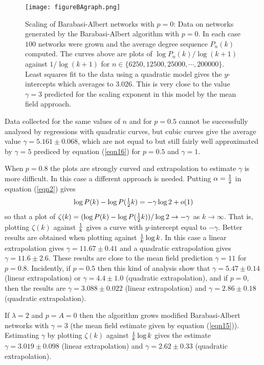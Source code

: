 \documentclass[12pt]{iopart}
\def\sfrac#1#2{\hbox{\normalsize $\frac{#1}{#2}$}}
\def\Ref#1{(\ref{#1})}
\begin{document}
\begin{figure}[t!]
 \centering
\texttt{[image: figureBAgraph.png]}
\caption{{Scaling of Barabasi-Albert networks with $p=0$:}
Data on networks generated by the Barabasi-Albert algorithm with $p=0$.  In each case $100$
networks were grown and the average degree sequence $P_n(k)$ computed.  The curves above
are plots of $\log P_n(k)/\log (k+1)$ against $1/\log (k+1)$ for $n\in\{6250,12500,25000,\cdots,200000\}$.
Least squares fit to the data using a quadratic model gives the $y$-intercepts which 
averages to $3.026$.  This is very close to the value $\gamma=3$ predicted for the scaling
exponent in this model by the mean field approach.}
\label{figureBAgraph}
\end{figure}

Data collected for the same values of $n$ and for $p=0.5$ cannot be successfully analysed
by regressions with quadratic curves, but cubic curves give the average value
$\gamma = 5.161 \pm 0.068$, which are not equal to but still fairly well approximated by $\gamma=5$
prediced by equation \Ref{eqn16} for $p=0.5$ and $\gamma=1$.

When $p=0.8$ the plots are strongly curved and extrapolation to estimate $\gamma$ is more
difficult.  In this case a different approach is needed.  Putting $\alpha = \sfrac{1}{2}$ in
equation \Ref{eqn2} gives
\begin{equation}
\log P(k) - \log P(\sfrac{1}{2}k) = - \gamma \log 2 + o(1)
\end{equation}
so that a plot of $\zeta(k) = (\log P(k) - \log P(\sfrac{1}{2}k))/\log 2 \to - \gamma$ as $k\to\infty$.
That is, plotting $\zeta(k)$ against $\sfrac{1}{k}$ gives a curve with $y$-intercept 
equal to $-\gamma$.  Better results are obtained when plotting against $\sfrac{1}{k}\log k$.
In this case a linear extrapolation gives $\gamma=11.67\pm0.41$ and a quadratic extrapolation
gives $\gamma=11.6\pm2.6$.  These results are close to the mean field prediction $\gamma=11$
for $p=0.8$.  Incidently, if $p=0.5$ then this kind of analysis show that $\gamma=5.47\pm0.14$
(linear extrapolation) or $\gamma=4.4\pm1.0$ (quadratic extrapolation), 
and if $p=0$, then the results are $\gamma=3.088\pm 0.022$ (linear extrapolation)
and $\gamma = 2.86\pm0.18$ (quadratic extrapolation).

If $\lambda=2$ and $p=A=0$ then the algorithm grows modified Barabasi-Albert networks
with $\gamma=3$ (the mean field estimate given by equation \Ref{eqn15}).  Estimating
$\gamma$ by plotting $\zeta(k)$ against $\sfrac{1}{k}\log k$ gives the estimate
$\gamma=3.019\pm 0.098$ (linear extrapolation) and $\gamma=2.62\pm 0.33$ (quadratic
extrapolation).
\end{document}
